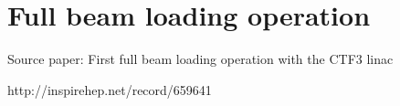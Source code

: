 \section{Full beam loading operation}

Source paper: First full beam loading operation with the CTF3 linac

http://inspirehep.net/record/659641
